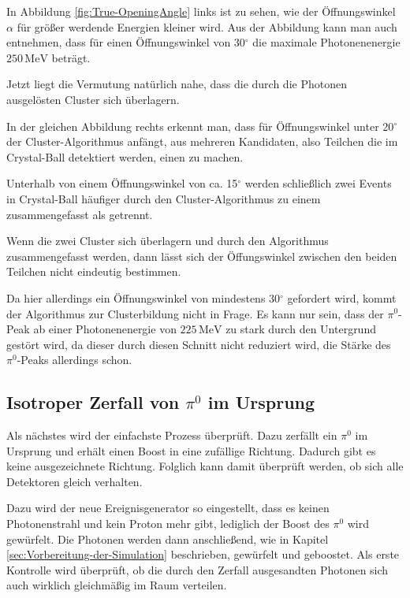 \documentclass[a4paper,11pt,oneside,final,german,openbib,pdftex]{scrbook}
\begin{document}
{In Abbildung \ref{fig:True-OpeningAngle} links ist zu sehen, wie der \"Offnungswinkel $\alpha$ f\"ur gr\"o{\ss}er werdende Energien kleiner wird. Aus der Abbildung kann man auch entnehmen, dass f\"ur einen \"Offnungswinkel von 30$^{\circ}$ die maximale Photonenenergie $250\,\text{MeV}$ betr\"agt.

Jetzt liegt die Vermutung nat\"urlich nahe, dass die durch die Photonen ausgel\"osten Cluster sich \"uberlagern. 

In der gleichen Abbildung rechts erkennt man, dass f\"ur \"Offnungswinkel unter 20$^{\circ}$ der Cluster-Algorithmus anf\"angt, aus mehreren Kandidaten, also Teilchen die im Crystal-Ball detektiert werden, einen zu machen.

Unterhalb von einem \"Offnungswinkel von ca. 15$^{\circ}$ werden schlie{\ss}lich zwei Events in Crystal-Ball h\"aufiger durch den Cluster-Algorithmus zu einem zusammengefasst als getrennt. 

Wenn die zwei Cluster sich \"uberlagern und durch den Algorithmus zusammengefasst werden, dann l\"asst sich der \"Offungswinkel zwischen den beiden Teilchen nicht eindeutig bestimmen.

Da hier allerdings ein \"Offnungswinkel von mindestens 30$^{\circ}$ gefordert wird, kommt der Algorithmus zur Clusterbildung nicht in Frage.
Es kann nur sein, dass der $\pi^0$-Peak ab einer Photonenenergie von $225\,\text{MeV}$ zu stark durch den Untergrund gest\"ort wird, da dieser durch diesen Schnitt nicht reduziert wird, die St\"arke des $\pi^0$-Peaks allerdings schon.




\subsection{Isotroper Zerfall von $\pi^0$ im Ursprung}
\label{sec:Isotroper-Zerfall-Ursprung}

Als n\"achstes wird der einfachste Prozess \"uberpr\"uft. Dazu zerf\"allt ein $\pi^0$ im Ursprung und erh\"alt einen Boost in eine zufällige Richtung. Dadurch gibt es keine ausgezeichnete Richtung. Folglich kann damit überprüft werden, ob sich alle Detektoren gleich verhalten. 

Dazu wird der neue Ereignisgenerator so eingestellt, dass es keinen Photonenstrahl und kein Proton mehr gibt, lediglich der Boost des $\pi^0$ wird gewürfelt. Die Photonen werden dann anschließend, wie in Kapitel \ref{sec:Vorbereitung-der-Simulation} beschrieben, gewürfelt und geboostet. 
Als erste Kontrolle wird \"uberpr\"uft, ob die durch den Zerfall ausgesandten Photonen sich auch wirklich gleichm\"a{\ss}ig im Raum verteilen.


}
\end{document}
